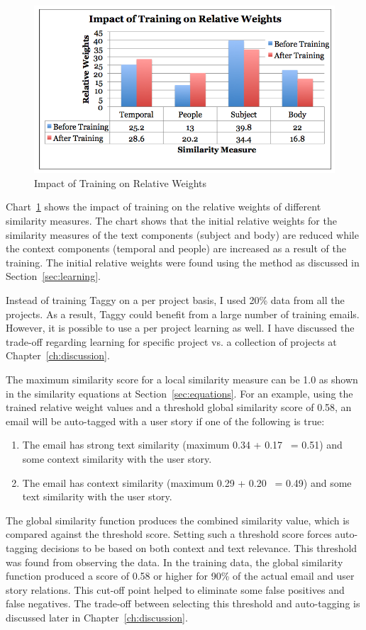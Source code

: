 \begin{figure}[htb]
	\centering
	\includegraphics[width=\textwidth]{training.png}
    \caption{Impact of Training on Relative Weights}
	\label{fig:training}
\end{figure}

Chart~\ref{fig:training} shows the impact of training on the relative weights of different similarity measures. The chart shows that the initial relative weights for the similarity measures of the text components (subject and body) are reduced while the context components (temporal and people) are increased as a result of the training. The initial relative weights were found using the method as discussed in Section~\ref{sec:learning}.

Instead of training Taggy on a per project basis, I used 20\% data from all the projects. As a result, Taggy could benefit from a large number of training emails. However, it is possible to use a per project learning as well. I have discussed the trade-off regarding learning for specific project vs. a collection of projects at Chapter~\ref{ch:discussion}.

The maximum similarity score for a local similarity measure can be 1.0 as shown in the similarity equations at Section~\ref{sec:equations}. For an example, using the trained relative weight values and a threshold global similarity score of 0.58, an email will be auto-tagged with a user story if one of the following is true:
\begin{enumerate}
	\item The email has strong text similarity (maximum 0.34 + 0.17 ~= 0.51) and some context similarity with the user story.
	\item The email has context similarity (maximum 0.29 + 0.20 ~= 0.49) and some text similarity with the user story.
\end{enumerate}
The global similarity function produces the combined similarity value, which is compared against the threshold score. Setting such a threshold score forces auto-tagging decisions to be based on both context and text relevance. This threshold was found from observing the data. In the training data, the global similarity function produced a score of 0.58 or higher for 90\% of the actual email and user story relations. This cut-off point helped to eliminate some false positives and false negatives. The trade-off between selecting this threshold and auto-tagging is discussed later in Chapter~\ref{ch:discussion}.  

